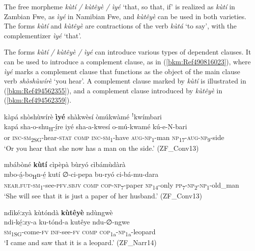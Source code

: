 The free morpheme \textit{kùtí / kùtêyè / ìyé} ‘that, so that, if’ is realized as \textit{kùtí} in Zambian Fwe, as \textit{ìyé} in Namibian Fwe, and \textit{kùtêyè} can be used in both varieties. The forms \textit{kùtí} and \textit{kùtêyè} are contractions of the verb \textit{kùtá} ‘to say’, with the complementizer \textit{ìyé} ‘that’.

\begin{sloppypar}
The forms \textit{kùtí / kùtêyè / ìyé} can introduce various types of dependent clauses. It can be used to introduce a complement clause, as in (\ref{bkm:Ref490816023}), where \textit{ìyé} marks a complement clause that functions as the object of the main clause verb \textit{shòshùwírè} ‘you hear’. A complement clause marked by \textit{kùtí} is illustrated in (\ref{bkm:Ref494562355}), and a complement clause introduced by \textit{kùtêyè} in (\ref{bkm:Ref494562359}).
\end{sloppypar}

\ea
\label{bkm:Ref490816023}
kàpá shòshùwírè \textbf{ìyé} shàkwèsí òmúkwàmé ꜝkwímbari\\
\gll kapá  sha-o-shu\textsubscript{H}-í̲re    iyé  sha-a-kwesí    o-mú-kwamé  kú-e-N-bari \\
or  \textsc{inc}-\textsc{sm}\textsubscript{2SG}-hear-\textsc{stat}  \textsc{comp}
\textsc{inc}-\textsc{sm}\textsubscript{1}-have  \textsc{aug}-\textsc{np}\textsubscript{1}-man  \textsc{np}\textsubscript{17}-\textsc{aug}-\textsc{np}\textsubscript{9}-side\\
\glt ‘Or you hear that she now has a man on the side.’ (ZF\_Conv13)
\z

\ea
\label{bkm:Ref494562355}
mbábòné \textbf{kùtí} cìpèpà bùryó cìbámùdàrà\\
\gll mbo-á̲-bo\textsubscript{H}n-é̲      kutí ∅-ci-pepa    bu-ryó  ci-bá-mu-dara \\
\textsc{near}.\textsc{fut}-\textsc{sm}\textsubscript{1}-see-\textsc{pfv}.\textsc{sbjv}  \textsc{comp}
\textsc{cop}-\textsc{np}\textsubscript{7}-paper  \textsc{np}\textsubscript{14}-only  \textsc{pp}\textsubscript{7}-\textsc{np}\textsubscript{2}-\textsc{np}\textsubscript{1}-old\_man\\
\glt ‘She will see that it is just a paper of her husband.’ (ZF\_Conv13)
\z

\ea
\label{bkm:Ref494562359}
ndìkéːzyà kùtóndà \textbf{kùtêyè} ndùngwè\\
\gll ndi-ké̲ːzy-a    ku-tónd-a  kutêye    ndu-∅-ngwe\\
\textsc{sm}\textsubscript{1SG}-come-\textsc{fv}  \textsc{inf}-see-\textsc{fv}  \textsc{comp}    \textsc{cop}\textsubscript{1a}-\textsc{np}\textsubscript{1a}-leopard\\
\glt ‘I came and saw that it is a leopard.’ (ZF\_Narr14)
\z

